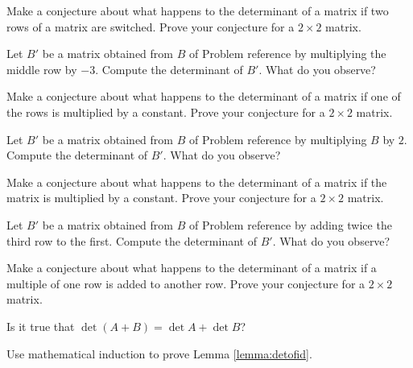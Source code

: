 \documentclass{ximera}
\begin{document}
\begin{problem}
Make a conjecture about what happens to the determinant of a matrix if two rows of a matrix are switched.  Prove your conjecture for a $2\times 2$ matrix.
\end{problem}

\begin{problem}Let $B'$ be a matrix obtained from $B$ of Problem {\color{red} reference} by multiplying the middle row by $-3$.  Compute the determinant of $B'$.  What do you observe?
\end{problem}

\begin{problem}
Make a conjecture about what happens to the determinant of a matrix if one of the rows is multiplied by a constant.  Prove your conjecture for a $2\times 2$ matrix.
\end{problem}

\begin{problem}Let $B'$ be a matrix obtained from $B$ of Problem {\color{red} reference} by multiplying $B$ by $2$.  Compute the determinant of $B'$.  What do you observe?
\end{problem}

\begin{problem}
Make a conjecture about what happens to the determinant of a matrix if the matrix is multiplied by a constant.  Prove your conjecture for a $2\times 2$ matrix.
\end{problem}

\begin{problem}
Let $B'$ be a matrix obtained from $B$ of Problem {\color{red} reference} by adding twice the third row to the first.  Compute the determinant of $B'$.  What do you observe?
\end{problem}

\begin{problem}
Make a conjecture about what happens to the determinant of a matrix if a multiple of one row is added to another row.  Prove your conjecture for a $2\times 2$ matrix.
\end{problem}

\begin{problem}
Is it true that 
$\det{(A+B)}=\det{A}+\det{B}$?
\end{problem}

\begin{problem}
Use mathematical induction to prove Lemma \ref{lemma:detofid}.
\end{problem}
\end{document}
